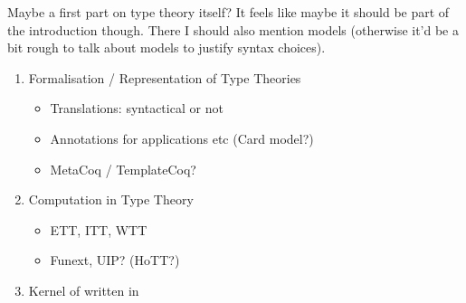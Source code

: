 Maybe a first part on type theory itself?
It feels like maybe it should be part of the introduction though.
There I should also mention models (otherwise it'd be a bit rough to talk
about models to justify syntax choices).

\begin{enumerate}
  \item Formalisation / Representation of Type Theories
    \begin{itemize}
      \item Translations: syntactical or not
      \item Annotations for applications etc (Card model?)
      \item MetaCoq / TemplateCoq?
    \end{itemize}
  \item Computation in Type Theory
    \begin{itemize}
      \item ETT, ITT, WTT
      \item Funext, UIP? (HoTT?)
    \end{itemize}
  \item Kernel of \Coq written in \Coq
\end{enumerate}